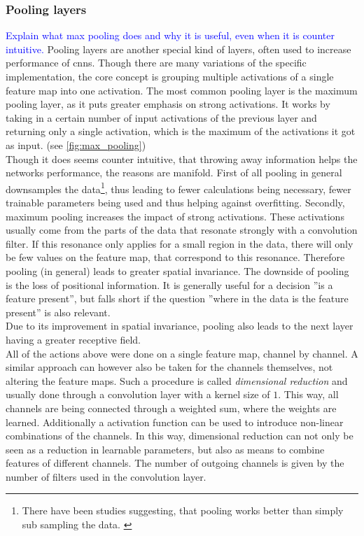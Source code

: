 \subsubsection{Pooling layers}\label{sec:pooling_layers}
\textcolor{blue}{Explain what max pooling does and why it is useful, even when it is counter intuitive.}
Pooling layers are another special kind of layers, often used to increase performance of \gls{cnns}. Though there are many variations of the specific implementation, the core concept is grouping multiple activations of a single feature map into one activation. The most common pooling layer is the maximum pooling layer, as it puts greater emphasis on strong activations.\cite{max_pooling_invention} It works by taking in a certain number of input activations of the previous layer and returning only a single activation, which is the maximum of the activations it got as input. (see \autoref{fig:max_pooling})\\
Though it does seems counter intuitive, that throwing away information helps the networks performance, the reasons are manifold. First of all pooling in general downsamples the data\footnote{There have been studies suggesting, that pooling works better than simply sub sampling the data. \cite{pooling_vs_subsampling}}, thus leading to fewer calculations being necessary, fewer trainable parameters being used and thus helping against overfitting. Secondly, maximum pooling increases the impact of strong activations. These activations usually come from the parts of the data that resonate strongly with a convolution filter. If this resonance only applies for a small region in the data, there will only be few values on the feature map, that correspond to this resonance. Therefore pooling (in general) leads to greater spatial invariance. The downside of pooling is the loss of positional information. It is generally useful for a decision ''is a feature present'', but falls short if the question ''where in the data is the feature present'' is also relevant.\\
Due to its improvement in spatial invariance, pooling also leads to the next layer having a greater receptive field.\medskip\\
All of the actions above were done on a single feature map, channel by channel. A similar approach can however also be taken for the channels themselves, not altering the feature maps. Such a procedure is called \emph{dimensional reduction} and usually done through a convolution layer with a kernel size of $1$. This way, all channels are being connected through a weighted sum, where the weights are learned.\cite{dim_red_invention} Additionally a activation function can be used to introduce non-linear  combinations of the channels. In this way, dimensional reduction can not only be seen as a reduction in learnable parameters, but also as means to combine features of different channels. \cite{dim_red_interpretation} The number of outgoing channels is given by the number of filters used in the convolution layer.
